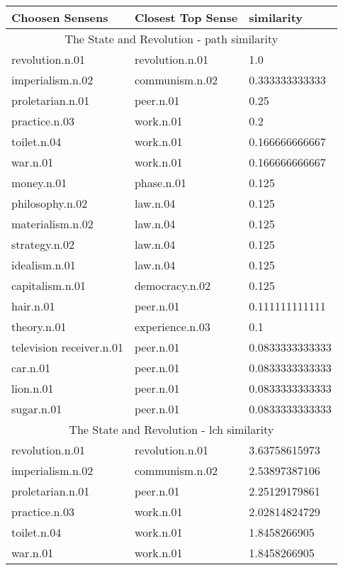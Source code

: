 
    \begin{center}
      \begin{tabular}{ | l | l | l |}
        \hline
        Choosen Sensens & Closest Top Sense & similarity  \\ \hline
\multicolumn{3}{|c|}{The State and Revolution - path similarity} \\ \hline
revolution.n.01 & revolution.n.01 & 1.0\\ \hline
imperialism.n.02 & communism.n.02 & 0.333333333333\\ \hline
proletarian.n.01 & peer.n.01 & 0.25\\ \hline
practice.n.03 & work.n.01 & 0.2\\ \hline
toilet.n.04 & work.n.01 & 0.166666666667\\ \hline
war.n.01 & work.n.01 & 0.166666666667\\ \hline
money.n.01 & phase.n.01 & 0.125\\ \hline
philosophy.n.02 & law.n.04 & 0.125\\ \hline
materialism.n.02 & law.n.04 & 0.125\\ \hline
strategy.n.02 & law.n.04 & 0.125\\ \hline
idealism.n.01 & law.n.04 & 0.125\\ \hline
capitalism.n.01 & democracy.n.02 & 0.125\\ \hline
hair.n.01 & peer.n.01 & 0.111111111111\\ \hline
theory.n.01 & experience.n.03 & 0.1\\ \hline
television receiver.n.01 & peer.n.01 & 0.0833333333333\\ \hline
car.n.01 & peer.n.01 & 0.0833333333333\\ \hline
lion.n.01 & peer.n.01 & 0.0833333333333\\ \hline
sugar.n.01 & peer.n.01 & 0.0833333333333\\ \hline
\multicolumn{3}{|c|}{The State and Revolution - lch similarity} \\ \hline
revolution.n.01 & revolution.n.01 & 3.63758615973\\ \hline
imperialism.n.02 & communism.n.02 & 2.53897387106\\ \hline
proletarian.n.01 & peer.n.01 & 2.25129179861\\ \hline
practice.n.03 & work.n.01 & 2.02814824729\\ \hline
toilet.n.04 & work.n.01 & 1.8458266905\\ \hline
war.n.01 & work.n.01 & 1.8458266905\\ \hline

\end{tabular}
\end{center}
